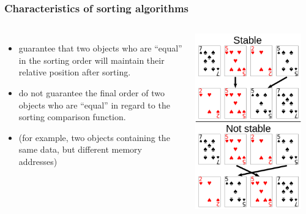 \documentclass{beamer}
\begin{document}
\begin{frame}
  \frametitle{Characteristics of sorting algorithms}
  \begin{columns}[c]
    \begin{itemize}
    \item {} guarantee that two objects who
      are ``equal'' in the sorting order will maintain their relative
      position after sorting.
    \item {} do not guarantee the final
      order of two objects who are ``equal'' in regard to the sorting
      comparison function.
    \item (for example, two objects containing the same data, but
      different memory addresses)
      \medskip
    \end{itemize}
    \includegraphics[width=0.9\textwidth]{img/sortingstability}
  \end{columns}
\end{frame}
\end{document}
